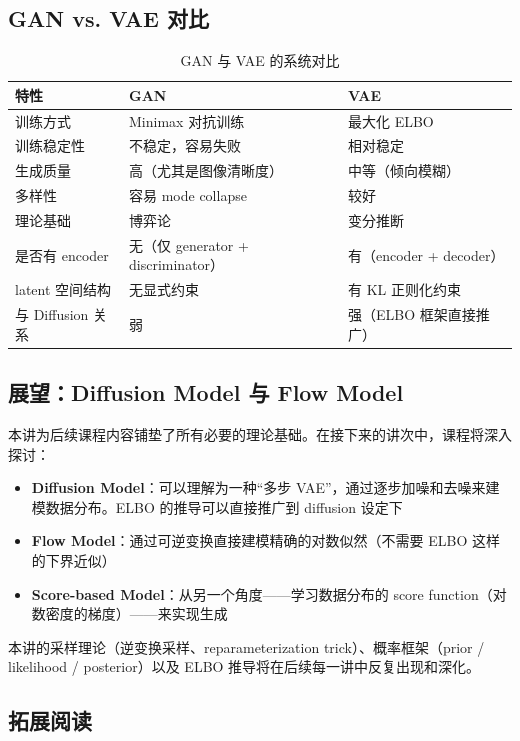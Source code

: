 \documentclass[a4paper]{article}
\begin{document}
\subsection{GAN vs. VAE 对比}

\begin{table}[H]
\centering
\begin{tabular}{lll}
\toprule
特性 & GAN & VAE \\
\midrule
训练方式 & Minimax 对抗训练 & 最大化 ELBO \\
训练稳定性 & 不稳定，容易失败 & 相对稳定 \\
生成质量 & 高（尤其是图像清晰度） & 中等（倾向模糊） \\
多样性 & 容易 mode collapse & 较好 \\
理论基础 & 博弈论 & 变分推断 \\
是否有 encoder & 无（仅 generator + discriminator） & 有（encoder + decoder） \\
latent 空间结构 & 无显式约束 & 有 KL 正则化约束 \\
与 Diffusion 关系 & 弱 & 强（ELBO 框架直接推广） \\
\bottomrule
\end{tabular}
\caption{GAN 与 VAE 的系统对比}
\end{table}

\subsection{展望：Diffusion Model 与 Flow Model}

本讲为后续课程内容铺垫了所有必要的理论基础。在接下来的讲次中，课程将深入探讨：

\begin{itemize}
    \item \textbf{Diffusion Model}：可以理解为一种``多步 VAE''，通过逐步加噪和去噪来建模数据分布。ELBO 的推导可以直接推广到 diffusion 设定下
    \item \textbf{Flow Model}：通过可逆变换直接建模精确的对数似然（不需要 ELBO 这样的下界近似）
    \item \textbf{Score-based Model}：从另一个角度——学习数据分布的 score function（对数密度的梯度）——来实现生成
\end{itemize}

本讲的采样理论（逆变换采样、reparameterization trick）、概率框架（prior / likelihood / posterior）以及 ELBO 推导将在后续每一讲中反复出现和深化。

\subsection{拓展阅读}
\end{document}
